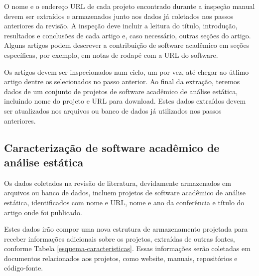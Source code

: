 \begin{description}
O nome e o endereço URL de cada projeto encontrado durante a inspeção manual
devem ser extraídos e armazenados junto aos dados já coletados nos passos
anteriores da revisão. A inspeção deve incluir a leitura do título, introdução,
resultados e conclusões de cada artigo e, caso necessário, outras
seções do artigo. Alguns artigos podem descrever a contribuição de software acadêmico
em seções específicas, por exemplo, em
notas de rodapé com a URL do software.

Os artigos devem ser inspecionados num ciclo, um por vez, até chegar ao útlimo
artigo dentre os selecionados no passo anterior. Ao final da extração, teremos
dados de um conjunto de projetos de software acadêmico de análise estática,
incluindo nome do projeto e URL para download. Estes dados extraídos devem ser
atualizados nos arquivos ou banco de dados já utilizados nos passos anteriores.

\end{description}

\subsection{Caracterização de software acadêmico de análise estática}

Os dados coletados na revisão de literatura, devidamente armazenados em
arquivos ou banco de dados, incluem projetos de software acadêmico de análise
estática, identificados com nome e URL, nome e ano da conferência e
título do artigo onde foi publicado.

Estes dados irão compor uma nova estrutura de armazenamento
projetada para receber informações adicionais sobre os projetos, 
extraídas de outras fontes, conforme Tabela
\ref{esquema-caracteristicas}. Essas informações serão coletadas em documentos
relacionados aos projetos, como website, manuais, repositórios e código-fonte.


